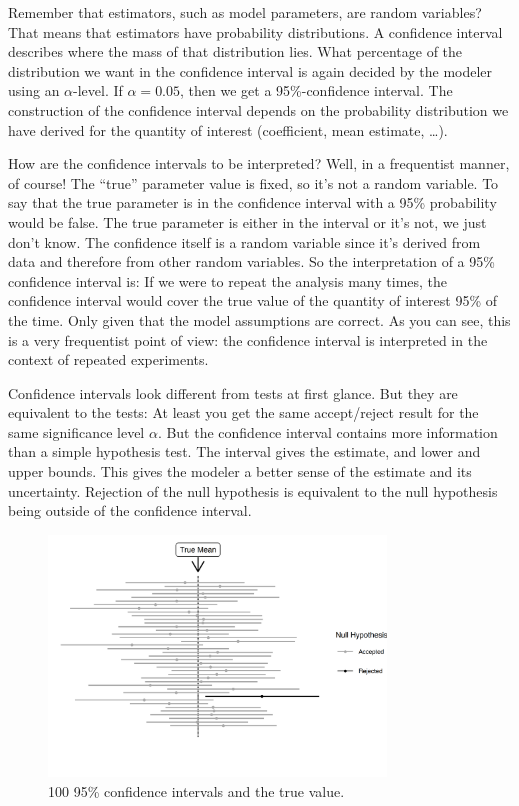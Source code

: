 \documentclass[
  10pt,
]{scrbook}
\begin{document}
Remember that estimators, such as model parameters, are random variables?
That means that estimators have probability distributions.
A confidence interval describes where the mass of that distribution lies.
What percentage of the distribution we want in the confidence interval is again decided by the modeler using an \(\alpha\)-level.
If \(\alpha = 0.05\), then we get a 95\%-confidence interval.
The construction of the confidence interval depends on the probability distribution we have derived for the quantity of interest (coefficient, mean estimate, \ldots).

How are the confidence intervals to be interpreted?
Well, in a frequentist manner, of course!
The ``true'' parameter value is fixed, so it's not a random variable.
To say that the true parameter is in the confidence interval with a 95\% probability would be false.
The true parameter is either in the interval or it's not, we just don't know.
The confidence itself is a random variable since it's derived from data and therefore from other random variables.
So the interpretation of a 95\% confidence interval is:
If we were to repeat the analysis many times, the confidence interval would cover the true value of the quantity of interest 95\% of the time.
Only given that the model assumptions are correct.
As you can see, this is a very frequentist point of view: the confidence interval is interpreted in the context of repeated experiments.

Confidence intervals look different from tests at first glance.
But they are equivalent to the tests:
At least you get the same accept/reject result for the same significance level \(\alpha\).
But the confidence interval contains more information than a simple hypothesis test.
The interval gives the estimate, and lower and upper bounds.
This gives the modeler a better sense of the estimate and its uncertainty.
Rejection of the null hypothesis is equivalent to the null hypothesis being outside of the confidence interval.

\begin{figure}

{\centering \includegraphics[width=0.8\textwidth]{figures/ci-1} 

}

\caption{100 95\% confidence intervals and the true value.}\label{fig:ci}
\end{figure}
\end{document}
